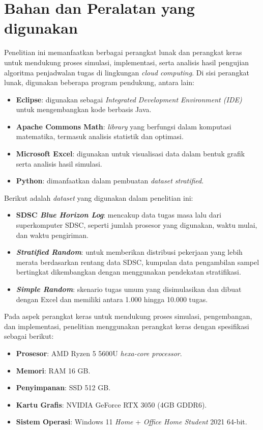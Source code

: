 \section{Bahan dan Peralatan yang digunakan}
Penelitian ini memanfaatkan berbagai perangkat lunak dan perangkat keras untuk mendukung proses simulasi, implementasi, serta analisis hasil pengujian algoritma penjadwalan tugas di lingkungan \textit{cloud computing}. Di sisi perangkat lunak, digunakan beberapa program pendukung, antara lain:
\begin{itemize} [nolistsep]
    \item \textbf{Eclipse}: digunakan sebagai \textit{Integrated Development Environment (IDE)} untuk mengembangkan kode berbasis Java.
    \item \textbf{Apache Commons Math}: \textit{library} yang berfungsi dalam komputasi matematika, termasuk analisis statistik dan optimasi.
    \item \textbf{Microsoft Excel}: digunakan untuk visualisasi data dalam bentuk grafik serta analisis hasil simulasi.
    \item \textbf{Python}: dimanfaatkan dalam pembuatan \textit{dataset stratified}.
\end{itemize}

Berikut adalah \textit{dataset} yang digunakan dalam penelitian ini:
\begin{itemize} [nolistsep]
    \item \textbf{SDSC \textit{Blue Horizon Log}}: mencakup data tugas masa lalu dari superkomputer SDSC, seperti jumlah prosesor yang digunakan, waktu mulai, dan waktu pengiriman.
    \item \textbf{\textit{Stratified Random}}: untuk memberikan distribusi pekerjaan yang lebih merata berdasarkan rentang data SDSC, kumpulan data pengambilan sampel bertingkat dikembangkan dengan menggunakan pendekatan stratifikasi.
    \item \textbf{\textit{Simple Random}}: skenario tugas umum yang disimulasikan dan dibuat dengan Excel dan memiliki antara 1.000 hingga 10.000 tugas.
\end{itemize}

Pada aspek perangkat keras untuk mendukung proses simulasi, pengembangan, dan implementasi, penelitian menggunakan perangkat keras dengan spesifikasi sebagai berikut:
\begin{itemize} [nolistsep]
    \item \textbf{Prosesor}: AMD Ryzen 5 5600U \textit{hexa-core processor}.
    \item \textbf{Memori}: RAM 16 GB.
    \item \textbf{Penyimpanan}: SSD 512 GB.
    \item \textbf{Kartu Grafis}: NVIDIA GeForce RTX 3050 (4GB GDDR6).
    \item \textbf{Sistem Operasi}: Windows 11 \textit{Home} + \textit{Office Home Student} 2021 64-bit.
\end{itemize}

